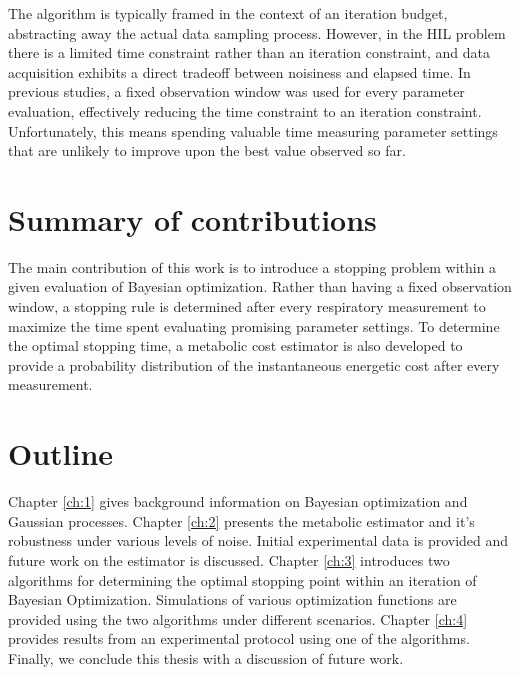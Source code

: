 The algorithm is typically framed in the context of an iteration budget, abstracting away the actual data sampling process. However, in the HIL problem there is a limited time constraint rather than an iteration constraint, and data acquisition exhibits a direct tradeoff between noisiness and elapsed time. In previous studies, a fixed observation window was used for every parameter evaluation, effectively reducing the time constraint to an iteration constraint. Unfortunately, this means spending valuable time measuring parameter settings that are unlikely to improve upon the best value observed so far.

\section*{Summary of contributions}
The main contribution of this work is to introduce a stopping problem within a given evaluation of Bayesian optimization. Rather than having a fixed observation window, a stopping rule is determined after every respiratory measurement to maximize the time spent evaluating promising parameter settings. To determine the optimal stopping time, a metabolic cost estimator is also developed to provide a probability distribution of the instantaneous energetic cost after every measurement.

\section*{Outline}
Chapter \ref{ch:1} gives background information on Bayesian optimization and Gaussian processes. Chapter \ref{ch:2} presents the metabolic estimator and it's robustness under various levels of noise. Initial experimental data is provided and future work on the estimator is discussed. Chapter \ref{ch:3} introduces two algorithms for determining the optimal stopping point within an iteration of Bayesian Optimization. Simulations of various optimization functions are provided using the two algorithms under different scenarios. Chapter \ref{ch:4} provides results from an experimental protocol using one of the algorithms. Finally, we conclude this thesis with a discussion of future work.